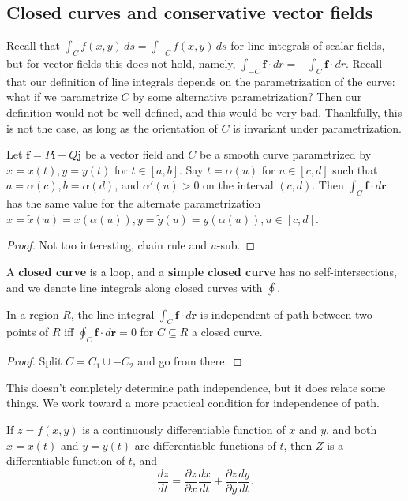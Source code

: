 \subsection{Closed curves and conservative vector fields}
Recall that $\int_{C}^{} f(x,y) \, ds=\int_{-C}^{} f(x,y) \, ds$ for line integrals of scalar fields, but for vector fields this does not hold, namely, $\int_{-C}^{} \mathbf f \cdot  dr=-\int_{C}^{} \mathbf f \cdot dr $. Recall that our definition of line integrals depends on the parametrization of the curve: what if we parametrize $C$ by some alternative parametrization? Then our definition would not be well defined, and this would be very bad. Thankfully, this is not the case, as long as the orientation of $C$ is invariant under parametrization.
\begin{theorem}
    Let $\mathbf f=P\mathbf i+Q\mathbf j$ be a vector field and $C$ be a smooth curve parametrized by $x=x(t),y=y(t)$ for $t\in [a,b]$. Say $t=\alpha (u)$ for $u\in [c,d]$ such that $a=\alpha (c),b=\alpha (d)$, and $\alpha '(u)>0$ on the interval $(c,d)$. Then $\int_{C}^{} \mathbf f \cdot d\mathbf r$ has the same value for the alternate parametrization $x=\widetilde x(u)=x(\alpha (u)),y=\widetilde y(u)=y(\alpha (u)),u\in [c,d]$.
\end{theorem}
\begin{proof}
    Not too interesting, chain rule and $u$-sub.
\end{proof}
A \textbf{closed curve} is a loop, and a \textbf{simple closed curve} has no self-intersections, and we denote line integrals along closed curves with $\oint$. 
\begin{theorem}
    In a region $R$, the line integral $\int_{C}^{} \mathbf f \cdot  d\mathbf r$ is independent of path between two points of $R$ iff $\oint_{C}^{} \mathbf f \cdot  d\mathbf r=0$ for $C\subseteq R$ a closed curve.
\end{theorem}
\begin{proof}
    Split $C=C_1\cup -C_2$ and go from there.
\end{proof}
This doesn't completely determine path independence, but it does relate some things. We work toward a more practical condition for independence of path.
\begin{theorem}
    If $z=f(x,y)$ is a continuously differentiable function of $x$ and $y$, and both $x=x(t)$ and $y=y(t)$ are differentiable functions of $t$, then $Z$ is a differentiable function of $t$, and \[
    \frac{dz}{dt}=\frac{\partial z}{\partial x}\frac{dx}{dt}+ \frac{\partial z}{\partial y}\frac{dy}{dt}.
    \]  
\end{theorem}
